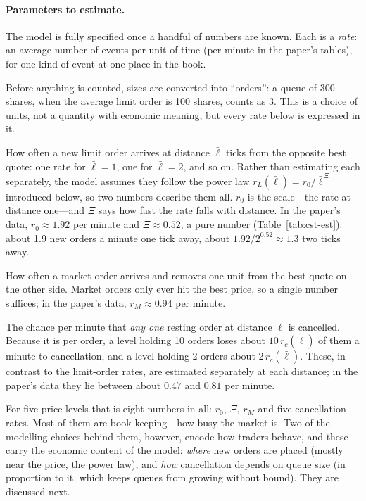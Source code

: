 \paragraph{Parameters to estimate.} The model is fully specified once a handful of numbers are known.
Each is a \emph{rate}: an average number of events per unit of time (per minute in the paper's tables),
for one kind of event at one place in the book.
\begin{description}[leftmargin=1.5em,style=nextline,itemsep=3pt]
\item[The unit of size] Before anything is counted, sizes are converted into ``orders'': a queue of 300
  shares, when the average limit order is 100 shares, counts as 3. This is a choice of units, not a
  quantity with economic meaning, but every rate below is expressed in it.
\item[Limit-order rates $r_L(\bar\ell)$, summarised by $r_0$ and $\Xi$] How often a new limit order
  arrives at distance $\bar\ell$ ticks from the opposite best quote: one rate for $\bar\ell = 1$, one for
  $\bar\ell = 2$, and so on. Rather than estimating each separately, the model assumes they follow the
  power law $r_L(\bar\ell) = r_0/\bar\ell^{\,\Xi}$ introduced below, so two numbers describe them all.
  $r_0$ is the scale---the rate at distance one---and $\Xi$ says how fast the rate falls with distance. In
  the paper's data, $r_0 \approx 1.92$ per minute and $\Xi \approx 0.52$, a pure number
(Table~\ref{tab:cst-est}): about
  1.9 new orders a minute one tick away, about $1.92/2^{0.52} \approx 1.3$ two ticks away.
\item[One market-order rate $r_M$] How often a market order arrives and removes one unit from the best
  quote on the other side. Market orders only ever hit the best price, so a single number suffices; in
  the paper's data, $r_M \approx 0.94$ per minute.
\item[Cancellation rates $r_c(\bar\ell)$, one per distance] The chance per minute that \emph{any one}
  resting order at distance $\bar\ell$ is cancelled. Because it is per order, a level holding 10 orders
  loses about $10\,r_c(\bar\ell)$ of them a minute to cancellation, and a level holding 2 orders about
  $2\,r_c(\bar\ell)$. These, in contrast to the limit-order rates, are estimated separately at each distance; in the
  paper's data they lie between about $0.47$ and $0.81$ per minute.
\end{description}
For five price levels that is eight numbers in all: $r_0$, $\Xi$, $r_M$ and five cancellation rates. Most
of them are book-keeping---how busy the market is. Two of the modelling choices behind them, however,
encode how traders behave, and these carry the economic content of the model: \emph{where} new orders are
placed (mostly near the price, the power law), and \emph{how} cancellation depends on queue size (in
proportion to it, which keeps queues from growing without bound). They are discussed next.

